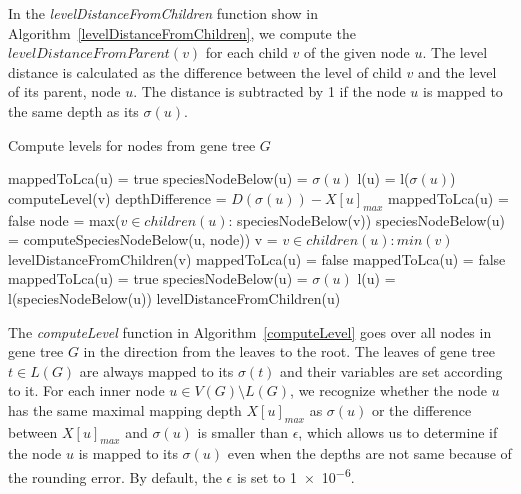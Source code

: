 In the \emph{levelDistanceFromChildren} function show in Algorithm~\ref{levelDistanceFromChildren}, we compute the $levelDistanceFromParent(v)$ for each child $v$ of the given node $u$. The level distance is calculated as the difference between the level of child $v$ and the level of its parent, node $u$. The distance is subtracted by 1 if the node $u$ is mapped to the same depth as its $\sigma(u)$.

\begin{algorithm}
\caption{Compute levels for nodes from gene tree $G$} 
\label{computeLevel}
\begin{algorithmic}[1]
		\State mappedToLca(u) = true
		\State speciesNodeBelow(u) = $\sigma(u)$
		\State l(u) = l($\sigma(u)$)
	\Else
			\State computeLevel(v)
		\EndFor
		\State depthDifference = $D(\sigma(u)) - X[u]_{max}$
			\State mappedToLca(u) = false
			\State node = max($v \in children(u)$: speciesNodeBelow(v))
			\State speciesNodeBelow(u) = computeSpeciesNodeBelow(u, node))
		\Else
					\State v = $v \in children(u): min(v)$
					\State levelDistanceFromChildren(v)
				\EndIf
				\State mappedToLca(u) = false
				\State mappedToLca(u) = false
			\Else
				\State mappedToLca(u) = true
			\EndIf
			\State speciesNodeBelow(u) = $\sigma(u)$
		\EndIf
		\State l(u) = l(speciesNodeBelow(u))
		\State levelDistanceFromChildren(u)
	\EndIf
\EndFunction
\end{algorithmic}
\end{algorithm}

The \emph{computeLevel} function in Algorithm~\ref{computeLevel} goes over all nodes in gene tree $G$ in the direction from the leaves to the root. The leaves of gene tree $t \in L(G)$ are always mapped to its $\sigma(t)$ and their variables are set according to it. For each inner node $u \in V(G) \setminus L(G)$, we recognize whether the node $u$ has the same maximal mapping depth $X[u]_{max}$ as $\sigma(u)$ or the difference between $X[u]_{max}$ and $\sigma(u)$ is smaller than $\epsilon$, which allows us to determine if the node $u$ is mapped to its $\sigma(u)$ even when the depths are not same because of the rounding error. By default, the $\epsilon$ is set to \num{1e-6}.

